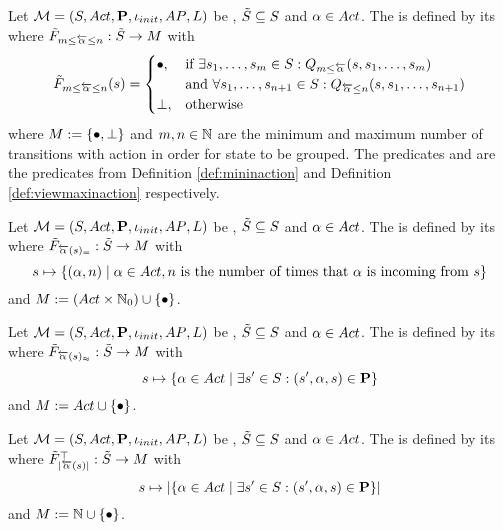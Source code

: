 \documentclass[preview]{standalone}
\begin{document}
\begin{definition}
	Let $\chgph = \chgphtuple$ be \achgphN, $\smstates \subseteq \states$ and $\action \in \actions$. The \viewN 
	\viewspaninaction is defined by its \grpfctN where $\gfctsubspaninaction : \smstates \to \imggrp$ with
	\[
	\gfctsubspaninaction(\state) =
	\begin{cases}
			\remelem,				& \text{if } \exists \state_1, \dots, \state_\numinactb \in \states: \predmininact[\numinactb] \\ &\text{and } \forall \state_1, \dots, \state_{\numinact+1} \in \states: \predmaxinact \\
			\notppty,     	& \text{otherwise}
		\end{cases}
	\]
	where $\imggrp := \imggrpbinview$
	and $\numinactb, \numinact \in \natnums$ are the minimum and maximum number of transitions with action \action in order for state to be grouped. The predicates \predmininact and \predmaxinact are the predicates from Definition \ref{def:mininaction} and Definition \ref{def:viewmaxinaction} respectively.
\end{definition}

\begin{definition}
	Let $\chgph = \chgphtuple$ be \achgphN, $\smstates \subseteq \states$ and $\action \in \actions$. The \viewN \viewstronginactident is defined by its \grpfctN \gfctstronginactident where $\gfctsubstronginactident : \smstates \to \imggrp$ with
	\[
	\state \mapsto	
	\{(\action, \numinact) \mid \action \in \actions, \numinact \text{ is the number of times that \action is incoming from } \state\}
	\]
	and $\imggrp := (\actions \times \natnums_0) \cup \remset$.
\end{definition}

\begin{definition}
	Let $\chgph = \chgphtuple$ be \achgphN, $\smstates \subseteq \states$ and $\action \in \actions$. The \viewN \viewweakinactident is defined by its \grpfctN \gfctweakinactident where $\gfctsubweakinactident : \smstates \to \imggrp$ with
	\[
	\state \mapsto \{\action \in \actions \mid \exists \state' \in \states : (\state', \action, \state) \in \trans\} 	
	\]
	and $\imggrp := \actions\cup \remset$.
\end{definition}

\begin{definition}
	Let $\chgph = \chgphtuple$ be \achgphN, $\smstates \subseteq \states$ and $\action \in \actions$. The \viewN \viewinactsetsize is defined by its \grpfctN \gfctinactsetsize where $\gfctsubinactsetsize : \smstates \to \imggrp$ with
	\[
	\state \mapsto |\{\action \in \actions \mid \exists \state' \in \states : (\state', \action, \state) \in \trans\}|
	\]
	and $\imggrp := \natnums \cup \remset$.
\end{definition}
\end{document}
